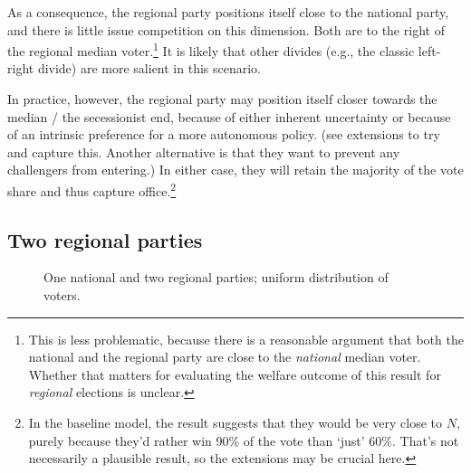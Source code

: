 \documentclass[11pt]{article}
\begin{document}
As a consequence, the regional party positions itself close to the national party, and there is little issue competition on this dimension. Both are to the right of the regional median voter.\footnote{This is less problematic, because there is a reasonable argument that both the national and the regional party are close to the \textit{national} median voter. Whether that matters for evaluating the welfare outcome of this result for \textit{regional} elections is unclear.} It is likely that other divides (e.g., the classic left-right divide) are more salient in this scenario.

In practice, however, the regional party may position itself closer towards the median / the secessionist end, because of either inherent uncertainty or because of an intrinsic preference for a more autonomous policy. (see extensions to try and capture this. Another alternative is that they want to prevent any challengers from entering.) In either case, they will retain the majority of the vote share and thus capture office.\footnote{In the baseline model, the result suggests that they would be very close to $N$, purely because they'd rather win 90\% of the vote than `just' 60\%. That's not necessarily a plausible result, so the extensions may be crucial here.}

\subsection{Two regional parties}

\begin{figure}[ht]
    \centering 
     \caption{One national and two regional parties; uniform distribution of voters.} \label{fig:mod1}
 \end{figure}
\end{document}
